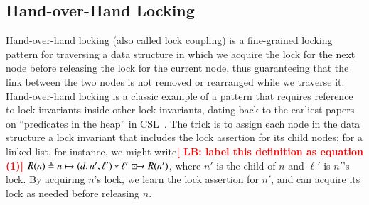 \documentclass[runningheads]{llncs}
\newcommand{\LB}[1]{\textbf{\textcolor{red}{[ LB: #1]}}}
\newcommand{\islock}{\boxdotright}
\begin{document}
\subsection{Hand-over-Hand Locking}
\label{selflock}

Hand-over-hand locking (also called lock coupling) is a fine-grained locking pattern for traversing a data structure in which we acquire the lock for the next node before releasing the lock for the current node, thus guaranteeing that the link between the two nodes is not removed or rearranged while we traverse it. Hand-over-hand locking is a classic example of a pattern that requires reference to lock invariants inside other lock invariants, dating back to the earliest papers on ``predicates in the heap'' in CSL~\cite{gotsman}. The trick is to assign each node in the data structure a lock invariant that includes the lock assertion for its child nodes; for a linked list, for instance, we might write\LB{label this definition as equation (1)} $R(n) \triangleq n \mapsto (d, n', \ell') * \ell' \islock R(n')$, where $n'$ is the child of $n$ and $\ell'$ is $n'$'s lock. By acquiring $n$'s lock, we learn the lock assertion for $n'$, and can acquire its lock as needed before releasing $n$.
\end{document}
